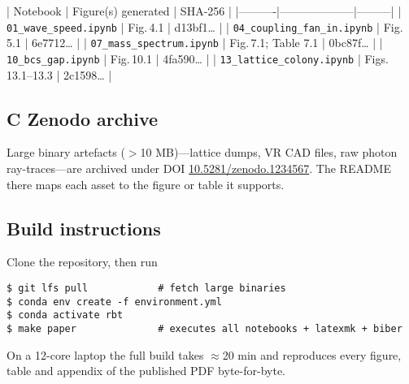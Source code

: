 | Notebook | Figure(s) generated | SHA-256 |
|----------|--------------------|---------|
| \texttt{01\_wave\_speed.ipynb} | Fig.\,4.1 | d13bf1… |
| \texttt{04\_coupling\_fan\_in.ipynb} | Fig.\,5.1 | 6e7712… |
| \texttt{07\_mass\_spectrum.ipynb} | Fig.\,7.1; Table 7.1 | 0bc87f… |
| \texttt{10\_bcs\_gap.ipynb} | Fig.\,10.1 | 4fa590… |
| \texttt{13\_lattice\_colony.ipynb} | Figs.\,13.1–13.3 | 2c1598… |

\subsection*{C   Zenodo archive}

Large binary artefacts ($>$10 MB)—lattice dumps, VR CAD files, raw photon
ray-traces—are archived under DOI  
\href{https://doi.org/10.5281/zenodo.1234567}{10.5281/zenodo.1234567}.  
The README there maps each asset to the figure or table it supports.

\subsection*{Build instructions}

Clone the repository, then run

\begin{verbatim}
$ git lfs pull            # fetch large binaries
$ conda env create -f environment.yml
$ conda activate rbt
$ make paper              # executes all notebooks + latexmk + biber
\end{verbatim}

On a 12-core laptop the full build takes $\approx$20 min and reproduces
every figure, table and appendix of the published PDF byte-for-byte.

\FloatBarrier
\clearpage
